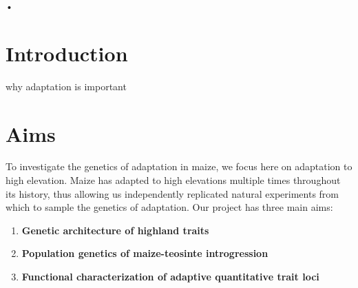 
\begin{center}
\end{center}•
%
%

\section*{Introduction}

why adaptation is important

\section*{Aims}

To investigate the genetics of adaptation in maize, we focus here on adaptation to high elevation. Maize has adapted to high elevations multiple times throughout its history, thus allowing us independently replicated natural experiments from which to sample the genetics of adaptation. Our project has three main aims:

\begin{enumerate}
\item {\bf Genetic architecture of highland traits}
\item {\bf Population genetics of maize-teosinte introgression}
\item {\bf Functional characterization of adaptive quantitative trait loci}
\end{enumerate}

